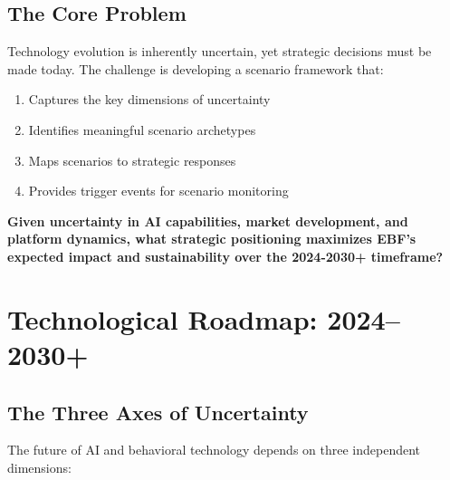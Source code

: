 \subsection{The Core Problem}

Technology evolution is inherently uncertain, yet strategic decisions must
be made today. The challenge is developing a scenario framework that:
\begin{enumerate}
    \item Captures the key dimensions of uncertainty
    \item Identifies meaningful scenario archetypes
    \item Maps scenarios to strategic responses
    \item Provides trigger events for scenario monitoring
\end{enumerate}

\begin{tcolorbox}[colback=red!5!white, colframe=red!75!black,
    title=The Fundamental Question]
\textbf{Given uncertainty in AI capabilities, market development, and platform
dynamics, what strategic positioning maximizes EBF's expected impact and
sustainability over the 2024-2030+ timeframe?}
\end{tcolorbox}


\section{Technological Roadmap: 2024--2030+}
\label{sec:vvv1-roadmap-detail}

\subsection{The Three Axes of Uncertainty}

The future of AI and behavioral technology depends on three independent dimensions:

